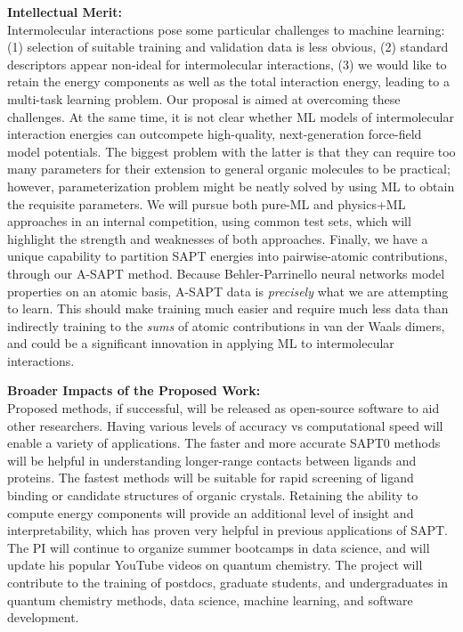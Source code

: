 \documentclass[11pt]{article}
\begin{document}
\hspace*{-0.28in} {\bf Intellectual Merit:} \\ 

Intermolecular
interactions pose some particular challenges to machine learning: (1)
selection of suitable training and validation data is less obvious, (2)
standard descriptors appear non-ideal for intermolecular interactions,
(3) we would like to retain the energy components as well as the
total interaction energy, leading to a multi-task learning problem.
Our proposal is aimed at overcoming these challenges.  At the same
time, it is not clear whether ML models of intermolecular interaction
energies can outcompete high-quality, next-generation force-field
model potentials.  The biggest problem with the latter is that they
can require too many parameters for their extension to general organic
molecules to be practical;  however, parameterization problem might be
neatly solved by using ML to obtain the requisite parameters.  We will
pursue both pure-ML and physics+ML approaches in an internal competition,
using common test sets, which will highlight the strength and weaknesses
of both approaches.  Finally, we
have a unique capability to partition SAPT energies into pairwise-atomic
contributions, through our A-SAPT method.  Because Behler-Parrinello
neural networks model properties on an atomic basis, A-SAPT data is {\em
precisely} what we are attempting to learn.  This should make training
much easier and require much less data than indirectly training to the
{\em sums} of atomic contributions in van der Waals dimers, and could be
a significant innovation in applying ML to intermolecular interactions.

\hspace*{-0.28in} {\bf Broader Impacts of the Proposed Work:} \\

Proposed methods, if successful, will be 
released as open-source software to aid other researchers.
Having various levels of accuracy vs computational speed will enable a
variety of applications.   The faster and more accurate SAPT0 methods
will be helpful in understanding longer-range contacts between ligands
and proteins.  The fastest methods will be suitable for rapid screening
of ligand binding or candidate structures of organic crystals.
Retaining the ability to compute energy components will provide an
additional level of insight and interpretability, which has proven
very helpful in previous applications of SAPT.  The PI will continue
to organize summer bootcamps in data science, and will update
his popular YouTube videos on quantum chemistry.  The project will
contribute to the training of postdocs, graduate students,
and undergraduates in quantum chemistry methods, data science, machine
learning, and software development.
\end{document}
